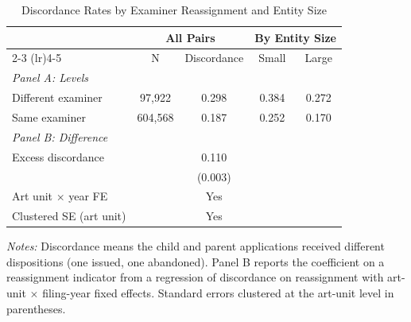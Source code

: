 \begin{table}[t]
\centering
\caption{Discordance Rates by Examiner Reassignment and Entity Size}
\label{tab:discordance}
\begin{tabular}{lcccc}
\hline\hline
 & \multicolumn{2}{c}{All Pairs} & \multicolumn{2}{c}{By Entity Size} \\
\cmidrule(lr){2-3} \cmidrule(lr){4-5}
 & N & Discordance & Small & Large \\
\hline
\textit{Panel A: Levels} & & & & \\
Different examiner & 97,922 & 0.298 & 0.384 & 0.272 \\
Same examiner & 604,568 & 0.187 & 0.252 & 0.170 \\
\hline
\textit{Panel B: Difference} & & & & \\
Excess discordance & & 0.110 & & \\
 & & (0.003) & & \\
\hline
Art unit $\times$ year FE & & Yes & & \\
Clustered SE (art unit) & & Yes & & \\
\hline\hline
\end{tabular}
\begin{tablenotes}[flushleft]
\small
\item \textit{Notes:} Discordance means the child and parent applications received different dispositions (one issued, one abandoned). Panel B reports the coefficient on a reassignment indicator from a regression of discordance on reassignment with art-unit $\times$ filing-year fixed effects. Standard errors clustered at the art-unit level in parentheses.
\end{tablenotes}
\end{table}
